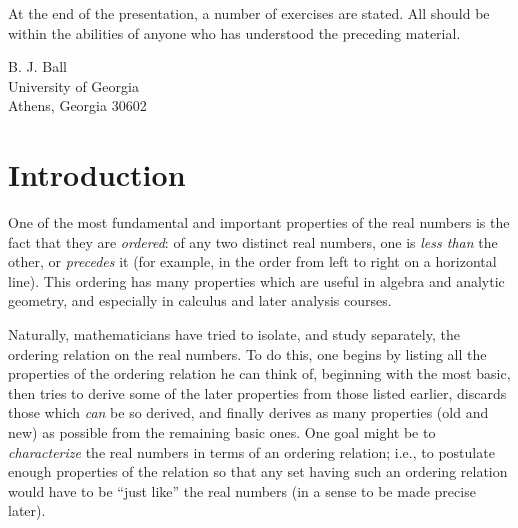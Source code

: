 \documentclass{article}
\begin{document}
At the end of the presentation, a number of exercises are stated. All should be within the abilities of anyone who has understood the preceding material.

\begin{flushright}B. J. Ball
\\ University of Georgia
\\ Athens, Georgia 30602
\end{flushright}

\newpage



\section{Introduction}


One of the most fundamental and important properties of the real numbers is the fact that they are \emph{ordered}: of any two distinct real numbers, one is \emph{less than} the other, or \emph{precedes} it (for example, in the order from left to right on a horizontal line). This ordering has many properties which are useful in algebra and analytic geometry, and especially in calculus and later analysis courses.

Naturally, mathematicians have tried to isolate, and study separately, the ordering relation on the real numbers. To do this, one begins by listing all the properties of the ordering relation he can think of, beginning with the most basic, then tries to derive some of the later properties from those listed earlier, discards those which \emph{can} be so derived, and finally derives as many properties (old and new) as possible from the remaining basic ones. One goal might be to \emph{characterize} the real numbers in terms of an ordering relation; i.e., to postulate enough properties of the relation so that any set having such an ordering relation would have to be ``just like'' the real numbers (in a sense to be made precise later).
\end{document}

